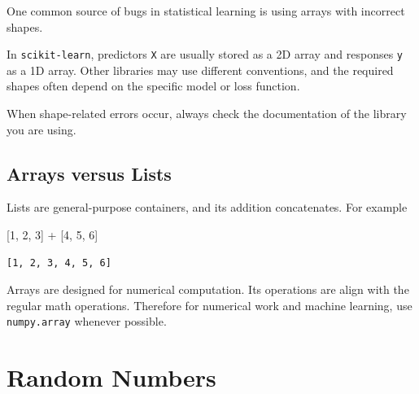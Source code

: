 \documentclass[
  letterpaper,
  DIV=11,
  numbers=noendperiod]{scrreprt}
\newenvironment{Shaded}{\begin{snugshade}}{\end{snugshade}}
\newcommand{\DecValTok}[1]{\textcolor[rgb]{0.68,0.00,0.00}{#1}}
\newcommand{\NormalTok}[1]{\textcolor[rgb]{0.00,0.23,0.31}{#1}}
\newcommand{\OperatorTok}[1]{\textcolor[rgb]{0.37,0.37,0.37}{#1}}
\theoremstyle{definition}
\theoremstyle{definition}
\theoremstyle{plain}
\theoremstyle{plain}
\theoremstyle{remark}
\begin{document}
\begin{tcolorbox}[enhanced jigsaw, arc=.35mm, bottomrule=.15mm, bottomtitle=1mm, breakable, colback=white, colbacktitle=quarto-callout-note-color!10!white, colframe=quarto-callout-note-color-frame, coltitle=black, left=2mm, leftrule=.75mm, opacityback=0, opacitybacktitle=0.6, rightrule=.15mm, title=\textcolor{quarto-callout-note-color}{\faInfo}\hspace{0.5em}{Note}, titlerule=0mm, toprule=.15mm, toptitle=1mm]

One common source of bugs in statistical learning is using arrays with
incorrect shapes.

In \texttt{scikit-learn}, predictors \texttt{X} are usually stored as a
2D array and responses \texttt{y} as a 1D array. Other libraries may use
different conventions, and the required shapes often depend on the
specific model or loss function.

When shape-related errors occur, always check the documentation of the
library you are using.

\end{tcolorbox}

\subsection{Arrays versus Lists}\label{arrays-versus-lists}

Lists are general-purpose containers, and its addition concatenates. For
example

\begin{Shaded}
\begin{Highlighting}[]
\NormalTok{[}\DecValTok{1}\NormalTok{, }\DecValTok{2}\NormalTok{, }\DecValTok{3}\NormalTok{] }\OperatorTok{+}\NormalTok{ [}\DecValTok{4}\NormalTok{, }\DecValTok{5}\NormalTok{, }\DecValTok{6}\NormalTok{]}
\end{Highlighting}
\end{Shaded}

\begin{verbatim}
[1, 2, 3, 4, 5, 6]
\end{verbatim}

Arrays are designed for numerical computation. Its operations are align
with the regular math operations. Therefore for numerical work and
machine learning, use \texttt{numpy.array} whenever possible.

\section{Random Numbers}\label{random-numbers}
\end{document}
